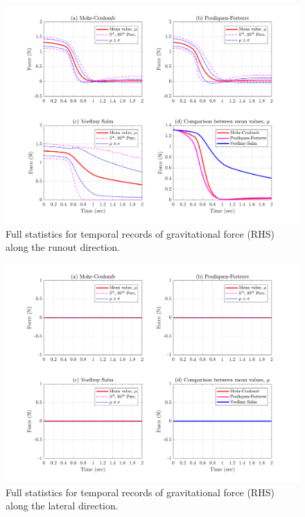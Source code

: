 \documentclass{article}
\begin{document}
\begin{figure}[H]
        \centering
        \includegraphics[width=1\textwidth]{InclinedPlane/GlobalRecords/Fgravx.png}
        \caption{Full statistics for temporal records of gravitational force (RHS) along the runout direction.}
        \label{fig:Ramp-Fgravx}
\end{figure}

\begin{figure}[H]
        \centering
        \includegraphics[width=1\textwidth]{InclinedPlane/GlobalRecords/Fgravy.png}
        \caption{Full statistics for temporal records of gravitational force (RHS) along the lateral direction.}
        \label{fig:Ramp-Fgravy}
\end{figure}
\end{document}
